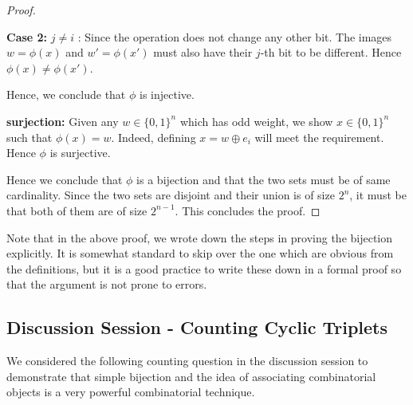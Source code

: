 \begin{proof}
\begin{description}
\begin{description}
\item{{\bf Case 2:} $j \ne i$ :} Since the operation does not change any other bit. The images $w = \phi(x)$ and $w' = \phi(x')$ must also have their $j$-th bit to  be different. Hence $\phi(x) \ne \phi(x')$.
\end{description}
Hence, we conclude that $\phi$ is injective.
\item{\bf surjection:} Given any $w \in \{0,1\}^n$ which has odd weight, we show $x \in \{0,1\}^n$ such that $\phi(x) = w$. Indeed, defining $x = w \oplus e_i$ will meet the requirement. Hence $\phi$ is surjective.
\end{description}
Hence we conclude that $\phi$ is a bijection and that the two sets must be of same cardinality. Since the two sets are disjoint and their union is of size $2^n$, it must be that both of them are of size $2^{n-1}$. This concludes the proof.
\end{proof}

Note that in the above proof, we wrote down the steps in proving the bijection explicitly. It is somewhat standard to skip over the one which are obvious from the definitions, but it is a good practice to write these down in a formal proof so that the argument is not prone to errors.

\subsection{Discussion Session - Counting Cyclic Triplets}

We considered the following counting question in the discussion session to demonstrate that simple bijection and the idea of associating combinatorial objects is a very powerful combinatorial technique.

